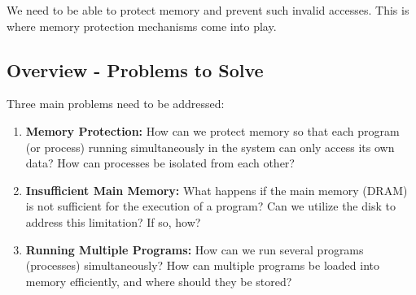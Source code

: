 We need to be able to protect memory and prevent such invalid accesses. This is where memory protection mechanisms come into play.

\subsection{Overview - Problems to Solve}
Three main problems need to be addressed:

\begin{enumerate}
    \item \textbf{Memory Protection:} How can we protect memory so that each program (or process) running simultaneously in the system can only access its own data? How can processes be isolated from each other?
    \item \textbf{Insufficient Main Memory:} What happens if the main memory (DRAM) is not sufficient for the execution of a program? Can we utilize the disk to address this limitation? If so, how?
    \item \textbf{Running Multiple Programs:} How can we run several programs (processes) simultaneously? How can multiple programs be loaded into memory efficiently, and where should they be stored?
\end{enumerate}
